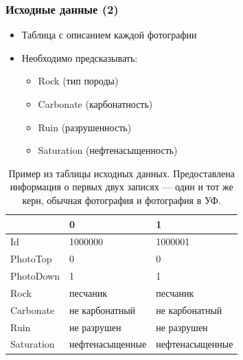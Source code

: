 \documentclass[xetex,mathserif,serif]{beamer}
\begin{document}
	
	\begin{frame}
		\frametitle{Исходные данные (2)}

        \begin{itemize}
            \item Таблица с описанием каждой фотографии
            \item Необходимо предсказывать:
            \begin{itemize}
                \item Rock (тип породы)
                \item Carbonate (карбонатность)
                \item Ruin (разрушенность)
                \item Saturation (нефтенасыщенность)
            \end{itemize}
        \end{itemize} 

        \begin{table}[]
            \centering
            \begin{adjustbox}{width=150,center}
            \begin{tabular}{|l|l|l|}
                \hline
                {} &                0 &                1 \\
                \hline
                Id             &          1000000 &          1000001 \\
                PhotoTop       &                0 &                0 \\
                PhotoDown      &                1 &                1 \\
                Rock           &         песчаник &         песчаник \\
                Carbonate      &   не карбонатный &   не карбонатный \\
                Ruin           &      не разрушен &      не разрушен \\
                Saturation     &  нефтенасыщенные &  нефтенасыщенные \\
                \hline
            \end{tabular}
            \end{adjustbox}
            \caption{Пример из таблицы исходных данных. Предоставлена информация о первых двух записях — один и тот же керн, обычная фотография и фотография в УФ.}
            \label{sample_table_cleaned} 
        \end{table}      
        
	\end{frame}		
	
\end{document}
